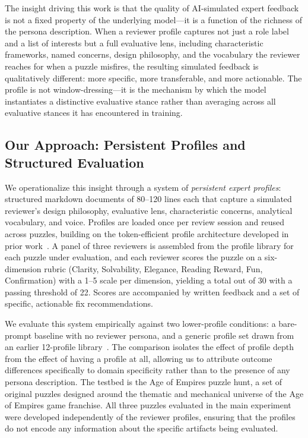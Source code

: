 The insight driving this work is that the quality of AI-simulated expert feedback is not a
fixed property of the underlying model---it is a function of the richness of the persona
description. When a reviewer profile captures not just a role label and a list of
interests but a full evaluative lens, including characteristic frameworks, named concerns,
design philosophy, and the vocabulary the reviewer reaches for when a puzzle misfires, the
resulting simulated feedback is qualitatively different: more specific, more transferable,
and more actionable. The profile is not window-dressing---it is the mechanism by which the
model instantiates a distinctive evaluative stance rather than averaging across all
evaluative stances it has encountered in training.

\subsection{Our Approach: Persistent Profiles and Structured Evaluation}

We operationalize this insight through a system of \emph{persistent expert profiles}:
structured markdown documents of 80--120 lines each that capture a simulated reviewer's
design philosophy, evaluative lens, characteristic concerns, analytical vocabulary, and
voice. Profiles are loaded once per review session and reused across puzzles, building on
the token-efficient profile architecture developed in prior work~\cite{dellaLibera2025profiles}.
A panel of three reviewers is assembled from the profile library for each puzzle under
evaluation, and each reviewer scores the puzzle on a six-dimension rubric (Clarity,
Solvability, Elegance, Reading Reward, Fun, Confirmation) with a 1--5 scale per dimension,
yielding a total out of 30 with a passing threshold of 22. Scores are accompanied by
written feedback and a set of specific, actionable fix recommendations.

We evaluate this system empirically against two lower-profile conditions: a bare-prompt
baseline with no reviewer persona, and a generic profile set drawn from an earlier 12-profile
library~\cite{dellaLibera2025profiles}. The comparison isolates the effect of profile depth
from the effect of having a profile at all, allowing us to attribute outcome differences
specifically to domain specificity rather than to the presence of any persona description.
The testbed is the Age of Empires puzzle hunt, a set of original puzzles designed around
the thematic and mechanical universe of the Age of Empires game franchise. All three
puzzles evaluated in the main experiment were developed independently of the reviewer
profiles, ensuring that the profiles do not encode any information about the specific
artifacts being evaluated.


